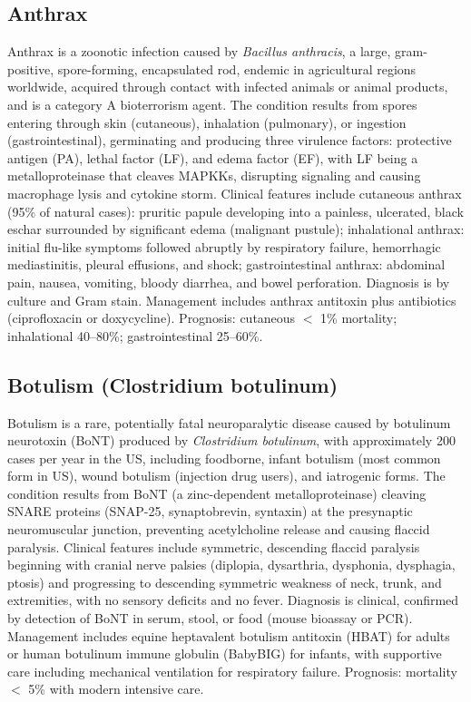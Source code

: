 \subsection{Anthrax}
\label{sec:Anthrax}
Anthrax is a zoonotic infection caused by \textit{Bacillus anthracis}, a large, gram-positive, spore-forming, encapsulated rod, endemic in agricultural regions worldwide, acquired through contact with infected animals or animal products, and is a category A bioterrorism agent. The condition results from spores entering through skin (cutaneous), inhalation (pulmonary), or ingestion (gastrointestinal), germinating and producing three virulence factors: protective antigen (PA), lethal factor (LF), and edema factor (EF), with LF being a metalloproteinase that cleaves MAPKKs, disrupting signaling and causing macrophage lysis and cytokine storm. Clinical features include cutaneous anthrax (95\% of natural cases): pruritic papule developing into a painless, ulcerated, black eschar surrounded by significant edema (malignant pustule); inhalational anthrax: initial flu-like symptoms followed abruptly by respiratory failure, hemorrhagic mediastinitis, pleural effusions, and shock; gastrointestinal anthrax: abdominal pain, nausea, vomiting, bloody diarrhea, and bowel perforation. Diagnosis is by culture and Gram stain. Management includes anthrax antitoxin plus antibiotics (ciprofloxacin or doxycycline). Prognosis: cutaneous $<$ 1\% mortality; inhalational 40--80\%; gastrointestinal 25--60\%.

\subsection{Botulism (Clostridium botulinum)}
\label{sec:Botulism}
Botulism is a rare, potentially fatal neuroparalytic disease caused by botulinum neurotoxin (BoNT) produced by \textit{Clostridium botulinum}, with approximately 200 cases per year in the US, including foodborne, infant botulism (most common form in US), wound botulism (injection drug users), and iatrogenic forms. The condition results from BoNT (a zinc-dependent metalloproteinase) cleaving SNARE proteins (SNAP-25, synaptobrevin, syntaxin) at the presynaptic neuromuscular junction, preventing acetylcholine release and causing flaccid paralysis. Clinical features include symmetric, descending flaccid paralysis beginning with cranial nerve palsies (diplopia, dysarthria, dysphonia, dysphagia, ptosis) and progressing to descending symmetric weakness of neck, trunk, and extremities, with no sensory deficits and no fever. Diagnosis is clinical, confirmed by detection of BoNT in serum, stool, or food (mouse bioassay or PCR). Management includes equine heptavalent botulism antitoxin (HBAT) for adults or human botulinum immune globulin (BabyBIG) for infants, with supportive care including mechanical ventilation for respiratory failure. Prognosis: mortality $<$ 5\% with modern intensive care.

